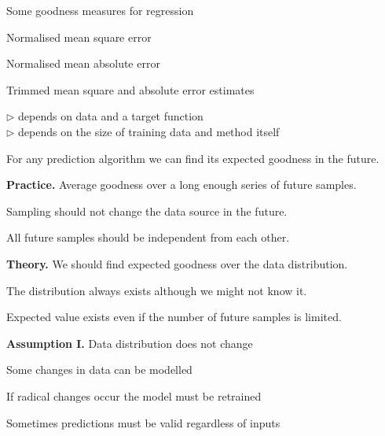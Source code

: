 \documentclass[landscape,footrule]{foils}
\begin{document}
Some goodness measures for regression
\begin{triangles}
\item Normalised mean square error
\item Normalised mean absolute error
\item Trimmed mean square and absolute error estimates  
\end{triangles}

\enlargethispage{1cm}
\vspace*{-0.0cm}
$\triangleright$  depends on data and a target function\\
$\triangleright$  depends on the size of training data and method itself


\enlargethispage{1cm}

For any prediction algorithm we can find its expected goodness in the future.

\textbf{Practice.} Average goodness over a long enough series of future samples.

\begin{triangles}
\item Sampling should not change the data source in the future. 
\item All future samples should be independent from each other. 
\end{triangles} 
\vspace*{2ex}

\textbf{Theory.} We should find expected goodness over the data distribution.
\begin{triangles}
\item The distribution always exists although we might not know it.  
\item Expected value exists even if the number of future samples is limited.
\end{triangles} 
\bigskip



\textbf{Assumption I.} Data distribution does not change
\begin{triangles}
\item Some changes in data can be modelled
\item If radical changes occur the model must be retrained
\item Sometimes predictions must be valid regardless of inputs  \vspace*{1cm}
\end{triangles}
\end{document}
